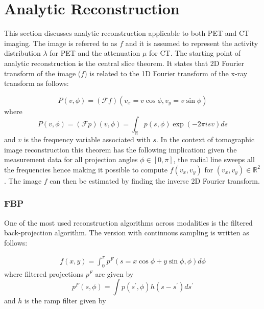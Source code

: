 \section{Analytic Reconstruction}

This section discusses analytic reconstruction applicable to both \ac{PET} and \ac{CT} imaging. The image is referred to as $f$ and it is assumed to represent the activity distribution $\lambda$ for \ac{PET} and the attenuation $\mu$ for \ac{CT}. The starting point of analytic reconstruction is the central slice theorem. It states that 2D Fourier transform of the image ($f$) is related to the 1D Fourier transform of the x-ray transform as follows:

\begin{equation}
P(v, \phi)=(\mathcal{F} f)\left(v_{x}=v \cos \phi, v_{y}=v \sin \phi\right)
\end{equation} 
where
\begin{equation}
P(v, \phi)=(\mathcal{F} p)(v, \phi)=\int_{\mathbb{R}}  p(s, \phi) \exp (-2 \pi i s v) d s
\end{equation}
and $v$ is the frequency variable associated with $s$. In the context of tomographic image reconstruction this theorem has the following implication: given the measurement data for all projection angles $\phi \in [0,\pi]$, the radial line sweeps all the frequencies hence making it possible to compute $f(v_{x},v_{y})$ for $(v_{x},v_{y})\in \mathbb{R}^2$. The image $f$ can then be estimated by finding the inverse 2D Fourier transform. 

\subsubsection{FBP}

One of the most used reconstruction algorithms across modalities is the filtered back-projection algorithm. The version with continuous sampling is written as follows:


\begin{equation}
\begin{array}{l}
f(x, y)=\int_{0}^{\pi}  p^{F}(s=x \cos \phi+y \sin \phi, \phi) d \phi
\end{array}
\end{equation}
where filtered projections $p^{F}$ are given by
\begin{equation}
p^{F}(s, \phi)=\int p\left(s^{\prime}, \phi\right) h\left(s-s^{\prime}\right) d s^{\prime}
\end{equation}
and $h$ is the ramp filter given by

